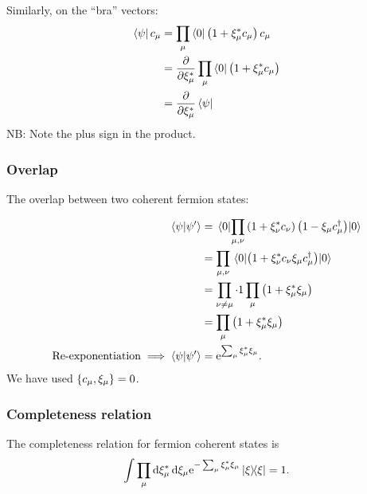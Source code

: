 Similarly, on the ``bra'' vectors:
\begin{align*}
\bra\psi c_\mu &= \prod_{\mu}\bra 0 \left(1+\xi_\mu^*c_\mu\right)c_\mu \\
&=\pdv{\xi_\mu^*}\prod_{\mu}\bra 0 \left(1+\xi_\mu^*c_\mu\right)\\
&= \pdv{\xi_\mu^*}\bra\psi
\end{align*}
NB: Note the plus sign in the product.

\subsubsection*{Overlap}
The overlap between two coherent fermion states:

\begin{align*}
\braket{\psi}{\psi'} &= \mel{0}{\prod_{\mu, \nu}\left(1+\xi_{\nu}^*c_{\nu}\right)\left(1-\xi_\mu c_\mu^\dagger\right)}{0} \\
&= \prod_{\mu, \nu}\mel{0}{\left(1+\xi_{\nu}^*c_{\nu}\xi_\mu c_\mu^\dagger\right)}{0}\\
&=\prod_{\nu \ne \mu}\cdot 1 \prod_{\mu}\left(1+\xi_\mu^*\xi_\mu\right) \\
&= \prod_{\mu}\left(1+\xi_\mu^*\xi_\mu\right) \\
\text{Re-exponentiation} \implies \braket{\psi}{\psi'} &= \mathrm{e}^{\sum_\mu\xi_\mu^*\xi_\mu}.
\end{align*}
We have used \(\acomm{c_\mu}{\xi_\mu}=0\).

\subsubsection*{Completeness relation}

The completeness relation for fermion coherent states is
\begin{equation}
\int \prod_{\mu}\dd{\xi_\mu^*}\dd{\xi_\mu \e^{-\sum_\mu\xi_\mu^*\xi_\mu}}\dyad{\xi} = 1.
\end{equation}

